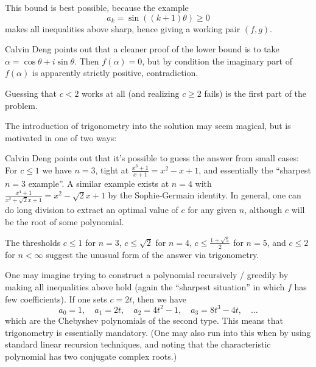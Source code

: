 This bound is best possible, because the example
\[ a_k = \sin\left( (k+1)\theta \right) \ge 0 \]
makes all inequalities above sharp, hence giving
a working pair $(f,g)$.

\begin{remark*}
Calvin Deng points out that a cleaner proof of the lower bound
is to take $\alpha = \cos \theta + i \sin \theta$.
Then $f(\alpha) = 0$, but by condition the imaginary part of $f(\alpha)$
is apparently strictly positive, contradiction.
\end{remark*}


\begin{remark*}
  Guessing that $c < 2$ works at all (and realizing $c \ge 2$ fails)
  is the first part of the problem.

  The introduction of trigonometry into the solution may seem magical,
  but is motivated in one of two ways:
  \begin{itemize}
    \ii Calvin Deng points out that it's possible to
    guess the answer from small cases:
    For $c \le 1$ we have $n = 3$, tight at $\frac{x^3+1}{x+1} = x^2-x+1$,
    and essentially the ``sharpest $n=3$ example''.
    A similar example exists at $n = 4$ with
    $\frac{x^4+1}{x^2+\sqrt 2 x+1} = x^2-\sqrt2x+1$
    by the Sophie-Germain identity.
    In general, one can do long division to extract
    an optimal value of $c$ for any given $n$,
    although $c$ will be the root of some polynomial.

    The thresholds $c \le 1$ for $n = 3$, $c \le \sqrt 2$ for $n = 4$,
    $c \le \frac{1+\sqrt5}{2}$ for $n = 5$,
    and $c \le 2$ for $n < \infty$ suggest the unusual form of the
    answer via trigonometry.

    \ii One may imagine trying to construct a polynomial
    recursively / greedily by making all inequalities above hold
    (again the ``sharpest situation'' in which $f$ has few coefficients).
    If one sets $c = 2t$, then we have
    \[ a_0 = 1, \quad a_1 = 2t, \quad a_2 = 4t^2-1, \quad
      a_3 = 8t^3-4t, \quad \dots \]
    which are the Chebyshev polynomials of the second type.
    This means that trigonometry is essentially mandatory.
    (One may also run into this when by using standard linear recursion techniques,
    and noting that the characteristic polynomial
    has two conjugate complex roots.)
  \end{itemize}
\end{remark*}

